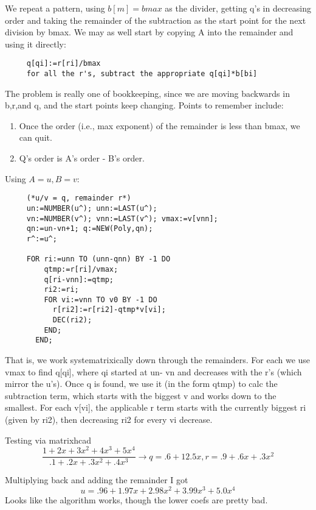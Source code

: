 We repeat a pattern, using $b[m]=bmax$ as the divider, getting
q's in decreasing order and taking the remainder of the
subtraction as the start point for the next division by
bmax.  We may as well start by copying A into the remainder
and using it directly:
\begin{verbatim}
     q[qi]:=r[ri]/bmax
     for all the r's, subtract the appropriate q[qi]*b[bi]
\end{verbatim}

The problem is really one of bookkeeping, since we are
moving backwards in b,r,and q, and the start points keep
changing.  Points to remember include:
\begin{enumerate}
     \item Once the order (i.e., max exponent) of the remainder
       is less than bmax, we can quit.
     \item Q's order is A's order - B's order.
\end{enumerate}
     
Using $A=u, B=v$:
\begin{tt} \begin{verbatim}
     (*u/v = q, remainder r*)
     un:=NUMBER(u^); unn:=LAST(u^);
     vn:=NUMBER(v^); vnn:=LAST(v^); vmax:=v[vnn];
     qn:=un-vn+1; q:=NEW(Poly,qn);
     r^:=u^;
     
     FOR ri:=unn TO (unn-qnn) BY -1 DO
         qtmp:=r[ri]/vmax;
         q[ri-vnn]:=qtmp;
         ri2:=ri;
         FOR vi:=vnn TO v0 BY -1 DO
           r[ri2]:=r[ri2]-qtmp*v[vi];
           DEC(ri2);
         END;
       END;
\end{verbatim} \end{tt}

That is, we work systematrixically down through the remainders.
For each we use vmax to find q[qi], where qi started at un-
vn and decreases with the r's (which mirror the u's).  Once
q is found, we use it (in the form qtmp) to calc the
subtraction term, which starts with the biggest v and works
down to the smallest.  For each v[vi], the applicable r term
starts with the currently biggest ri (given by ri2), then
decreasing ri2 for every vi decrease.

Testing via matrixhcad
\begin{equation}
   \frac{1+2x+3x^2+4x^3+5x^4}{.1+.2x+.3x^2+.4x^3} 
     \rightarrow q=.6+12.5x, r=.9+.6x+.3x^2
\end{equation}
    
Multiplying back and adding the remainder I got
\begin{equation}
     u= .96+1.97x+2.98x^2+3.99x^3+5.0x^4
\end{equation}
Looks like the algorithm works, though the lower coefs are
pretty bad.

